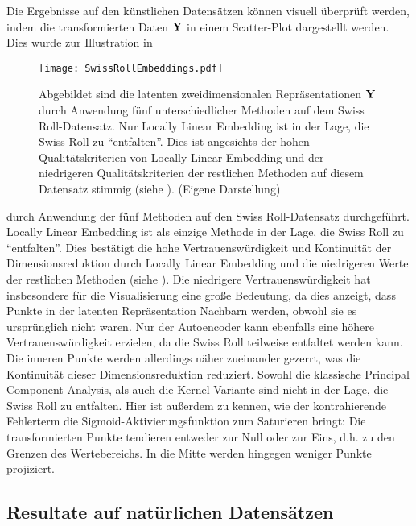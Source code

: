 Die Ergebnisse auf den künstlichen Datensätzen können visuell überprüft werden, indem die
transformierten Daten $\mat{Y}$ in einem Scatter-Plot dargestellt werden. Dies wurde zur
Illustration in 
\begin{figure}[ht]
	\centering
	\texttt{[image: SwissRollEmbeddings.pdf]}
	\caption[Latente zweidimensionale Repräsentationen $\mat{Y}$ von fünf unterschiedlichen Methoden auf dem Swiss Roll-Datensatz]{Abgebildet sind die latenten zweidimensionalen Repräsentationen $\mat{Y}$ durch Anwendung fünf unterschiedlicher Methoden auf dem Swiss Roll-Datensatz. Nur Locally Linear Embedding ist in der Lage, die Swiss Roll zu \enquote{entfalten}. Dies ist angesichts der hohen Qualitätskriterien von Locally Linear Embedding und der niedrigeren Qualitätskriterien der restlichen Methoden auf diesem Datensatz stimmig (siehe ). (Eigene Darstellung)}
	\label{fig:SwissRollEmbeddings}
\end{figure}
durch Anwendung der fünf Methoden auf den Swiss Roll-Datensatz durchgeführt.
Locally Linear Embedding ist als einzige Methode in der Lage, die Swiss Roll zu
\enquote{entfalten}. Dies bestätigt die hohe Vertrauenswürdigkeit und Kontinuität der
Dimensionsreduktion durch Locally Linear Embedding und die niedrigeren Werte der restlichen
Methoden (siehe ). Die niedrigere Vertrauenswürdigkeit hat
insbesondere für die Visualisierung eine große Bedeutung, da dies anzeigt, dass Punkte in der
latenten Repräsentation Nachbarn werden, obwohl sie es ursprünglich nicht waren. Nur der
Autoencoder kann ebenfalls eine höhere Vertrauenswürdigkeit erzielen, da die Swiss Roll teilweise
entfaltet werden kann. Die inneren Punkte werden allerdings näher zueinander gezerrt, was die
Kontinuität dieser Dimensionsreduktion reduziert. Sowohl die klassische Principal Component
Analysis, als auch die Kernel-Variante sind nicht in der Lage, die Swiss Roll zu entfalten. Hier
ist außerdem zu kennen, wie der kontrahierende Fehlerterm die Sigmoid-Aktivierungsfunktion zum
Saturieren bringt: Die transformierten Punkte tendieren entweder zur Null oder zur Eins, d.h. zu
den Grenzen des Wertebereichs. In die Mitte werden hingegen weniger Punkte projiziert.

\subsection{Resultate auf natürlichen Datensätzen}
\label{ch:Vergleich:sec:Resultate:natuerlich}

